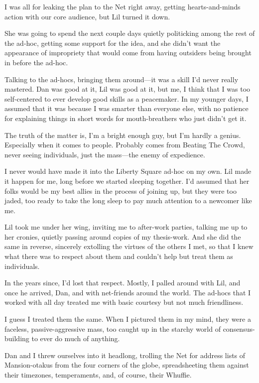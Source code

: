 I was all for leaking the plan to the Net right away, getting
hearts-and-minds action with our core audience, but Lil turned it
down.

She was going to spend the next couple days quietly politicking
among the rest of the ad-hoc, getting some support for the idea,
and she didn't want the appearance of impropriety that would come
from having outsiders being brought in before the ad-hoc.

Talking to the ad-hocs, bringing them around—it was a skill I'd
never really mastered. Dan was good at it, Lil was good at it, but
me, I think that I was too self-centered to ever develop good
skills as a peacemaker. In my younger days, I assumed that it was
because I was smarter than everyone else, with no patience for
explaining things in short words for mouth-breathers who just
didn't get it.

The truth of the matter is, I'm a bright enough guy, but I'm hardly
a genius. Especially when it comes to people. Probably comes from
Beating The Crowd, never seeing individuals, just the mass—the
enemy of expedience.

I never would have made it into the Liberty Square ad-hoc on my
own. Lil made it happen for me, long before we started sleeping
together. I'd assumed that her folks would be my best allies in the
process of joining up, but they were too jaded, too ready to take
the long sleep to pay much attention to a newcomer like me.

Lil took me under her wing, inviting me to after-work parties,
talking me up to her cronies, quietly passing around copies of my
thesis-work. And she did the same in reverse, sincerely extolling
the virtues of the others I met, so that I knew what there was to
respect about them and couldn't help but treat them as
individuals.

In the years since, I'd lost that respect. Mostly, I palled around
with Lil, and once he arrived, Dan, and with net-friends around the
world. The ad-hocs that I worked with all day treated me with basic
courtesy but not much friendliness.

I guess I treated them the same. When I pictured them in my mind,
they were a faceless, passive-aggressive mass, too caught up in the
starchy world of consensus-building to ever do much of anything.

Dan and I threw ourselves into it headlong, trolling the Net for
address lists of Mansion-otakus from the four corners of the globe,
spreadsheeting them against their timezones, temperaments, and, of
course, their Whuffie.

